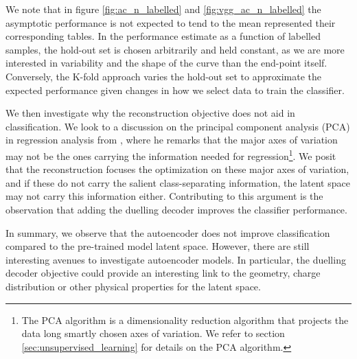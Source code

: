 We note that in figure \ref{fig:ac_n_labelled} and \ref{fig:vgg_ac_n_labelled} the asymptotic performance is not expected to tend to the mean represented their corresponding tables. In the performance estimate as a function of labelled samples, the hold-out set is chosen arbitrarily and held constant, as we are more interested in variability and the shape of the curve than the end-point itself. Conversely, the K-fold approach varies the hold-out set to approximate the expected performance given changes in how we select data to train the classifier.

We then investigate why the reconstruction objective does not aid in classification. We look to a discussion on the principal component analysis (PCA) in regression analysis from \citet{Jolliffe1982}, where he remarks that the major axes of variation may not be the ones carrying the information needed for regression\footnote{The PCA algorithm is a dimensionality reduction algorithm that projects the data long smartly chosen axes of variation. We refer to section \ref{sec:unsupervised_learning} for details on the PCA algorithm.}. We posit that the reconstruction focuses the optimization on these major axes of variation, and if these do not carry the salient class-separating information, the latent space may not carry this information either. Contributing to this argument is the observation that adding the duelling decoder improves the classifier performance.

In summary, we observe that the autoencoder does not improve classification compared to the pre-trained model latent space. However, there are still interesting avenues to investigate autoencoder models. In particular, the duelling decoder objective could provide an interesting link to the geometry, charge distribution or other physical properties for the latent space.

